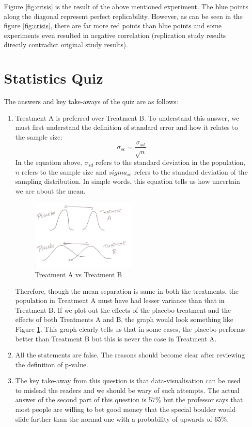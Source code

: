 Figure \ref{fig:crisis} is the result of the above mentioned experiment. The blue points along the diagonal represent perfect replicability. However, as can be seen in the figure \ref{fig:crisis}, there are far more red points than blue points and some experiments even resulted in negative correlation (replication study results directly contradict original study results).

\section{Statistics Quiz}
The answers and key take-aways of the quiz are as follows:
\begin{enumerate}
    \item Treatment A is preferred over Treatment B. To understand this answer, we must first understand the definition of standard error and how it relates to the sample size: 
    \begin{equation}
        \sigma_{se} = \frac{\sigma_{sd}}{\sqrt{n}}
    \end{equation}
    In the equation above, $\sigma_{sd}$ refers to the standard deviation in the population, $n$ refers to the sample size and $sigma_{se}$ refers to the standard deviation of the sampling distribution. In simple words, this equation tells us how uncertain we are about the mean. 
    \begin{figure}[ht]
      \begin{center}
        \includegraphics[width=0.5\textwidth,scale=2.0]{figures/msdq1.jpeg}
        \caption{
          Treatment A vs Treatment B}
        \label{fig:q1}
      \end{center}
    \end{figure}
    Therefore, though the mean separation is same in both the treatments, the population in Treatment A must have had lesser variance than that in Treatment B. If we plot out the effects of the placebo treatment and the effects of both Treatments A and B, the graph would look something like Figure \ref{fig:q1}. This graph clearly tells us that in some cases, the placebo performs better than Treatment B but this is never the case in Treatment A.
    \item All the statements are false. The reasons should become clear after reviewing the definition of p-value.
    \item The key take-away from this question is that data-visualisation can be used to mislead the readers and we should be wary of such attempts. The actual answer of the second part of this question is 57\% but the professor says that most people are willing to bet good money that the special boulder would slide farther than the normal one with a probability of upwards of 65\%.
\end{enumerate}
